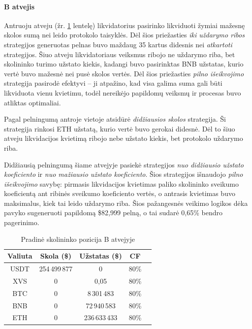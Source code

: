 \documentclass[]{VUMIFTemplateClass}
\begin{document}
\paragraph{B atvejis} Antruoju atveju (žr. \ref{case_b} lentelę) likvidatorius pasirinko likviduoti žymiai mažesnę skolos sumą nei leido protokolo taisyklės. Dėl šios priežasties \textit{iki uždarymo ribos} strategijos generuotas pelnas buvo maždaug 35 kartus didesnis nei \textit{atkartoti} strategijos. Šiuo atveju likvidatoriaus veiksmus ribojo ne uždarymo riba, bet skolininko turimo užstato kiekis, kadangi buvo pasirinktas BNB užstatas, kurio vertė buvo mažesnė nei pusė skolos vertės. Dėl šios priežasties \textit{pilno išeikvojimo} strategija pasirodė efektyvi – ji atpažino, kad visa galima suma gali būti likviduota vienu kvietimu, todėl nereikėjo papildomų veiksmų ir procesas buvo atliktas optimaliai.

Pagal pelningumą antroje vietoje atsidūrė \textit{didžiausios skolos} strategija. Ši strategija rinkosi ETH užstatą, kurio vertė buvo gerokai didesnė. Dėl to šiuo atveju likvidacijos kvietimą ribojo nebe užstato kiekis, bet protokolo uždarymo riba.

Didžiausią pelningumą šiame atvejyje pasiekė strategijos \textit{nuo didžiausio užstato koeficiento} ir \textit{nuo mažiausio užstato koeficiento}. Šios strategijos išnaudojo \textit{pilno išeikvojimo} savybę: pirmasis likvidacijos kvietimas paliko skolininko sveikumo koeficientą ant ribinės sveikumo koeficiento vertės, o antrasis kvietimas buvo maksimalus, kiek tai leido uždarymo riba. Šios pažangesnės veikimo logikos dėka pavyko sugeneruoti papildomą \$82,999 pelną, o tai sudarė 0,65\% bendro pagerinimo.

\begin{table}[H]
\centering
\caption{Pradinė skolininko pozicija B atvejyje}
\label{case_b}
\begin{tabular}{|c|c|c|c|c|}
\hline
\textbf{Valiuta} & \textbf{Skola (\$)} & \textbf{Užstatas (\$)} & \textbf{CF} \\ \hline
USDT &  254\,499\,877 &  0             & 80\%  \\ \hline
XVS  &  0             &  0,05          & 80\%  \\ \hline
BTC  &  0             &  8\,301\,483   & 80\%  \\ \hline
BNB  &  0             &  72\,940\,583  & 80\%  \\ \hline
ETH  &  0             &  236\,633\,433 & 80\%  \\ \hline
\end{tabular}
\end{table}
\end{document}
